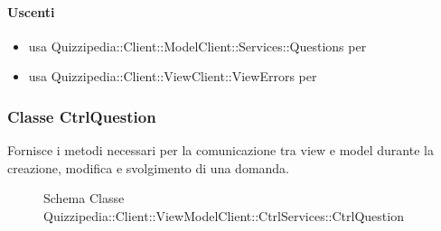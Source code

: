 \paragraph{Uscenti}
\begin{itemize}
\item usa Quizzipedia::Client::ModelClient::Services::Questions per 
\item usa Quizzipedia::Client::ViewClient::ViewErrors per 
\end{itemize}
\subsubsection{Classe CtrlQuestion}
Fornisce i metodi necessari per la comunicazione tra view e model durante la creazione, modifica e svolgimento di una domanda.
\begin{figure}[H]
\centering
\noindent{}
\caption[Schema Classe CtrlQuestion]{Schema Classe Quizzipedia::Client::ViewModelClient::CtrlServices::CtrlQuestion}
\end{figure}
